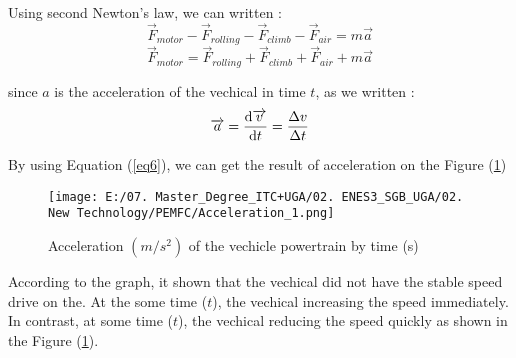 \documentclass[12pt,a4paper]{article}
\numberwithin{equation}{section}
\begin{document}
	Using second Newton's law, we can written :
	\begin{equation}
		\overrightarrow{F}_{motor} - \overrightarrow{F}_{rolling} -\overrightarrow{F}_{climb} - \overrightarrow{F}_{air} = m\overrightarrow{a}
		\label{eq4}
	\end{equation}
	\begin{equation}
		\overrightarrow{F}_{motor} = \overrightarrow{F}_{rolling} + \overrightarrow{F}_{climb} + \overrightarrow{F}_{air} + m\overrightarrow{a}
		\label{eq5}
	\end{equation}

	since $a$ is the acceleration of the vechical in time $t$, as we written : 
	\begin{equation}
		\overrightarrow{a} = \derivative{\overrightarrow{v}}{t} = \frac{\Delta v}{\Delta t}
		\label{eq6}
	\end{equation}

	By using Equation (\ref{eq6}), we can get the result of acceleration on the Figure (\ref{3})
	\begin{figure}[h]
		\centering 
		\texttt{[image: E:/07. Master\_Degree\_ITC+UGA/02. ENES3\_SGB\_UGA/02. New Technology/PEMFC/Acceleration\_1.png]}
		\caption{\small {Acceleration $(m/s^2)$ of the vechicle powertrain by time (s)}}
		\label{3}
	\end{figure}

	According to the graph, it shown that the vechical did not have the stable speed drive on the. At the some time ($t$), the vechical increasing the speed immediately. In contrast, at some time ($t$), the vechical reducing the speed quickly as shown in the Figure (\ref{3}).
\end{document}
